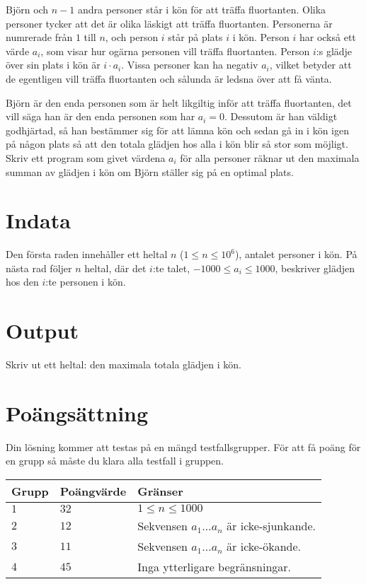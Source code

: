 Björn och $n-1$ andra personer står i kön för att träffa fluortanten. Olika personer tycker att det är olika läskigt att träffa fluortanten. Personerna är numrerade från $1$ till $n$, och person $i$ står på plats $i$ i kön. Person $i$ har också ett värde $a_i$, som visar hur ogärna personen vill träffa fluortanten. Person $i$:s glädje över sin plats i kön är $i \cdot a_i$. Vissa personer kan ha negativ $a_i$,
vilket betyder att de egentligen vill träffa fluortanten och sålunda är ledsna över att få vänta.

Björn är den enda personen som är helt likgiltig inför att träffa fluortanten, det vill säga han är den enda personen som har $a_i = 0$. Dessutom är han väldigt godhjärtad, så han bestämmer sig för att lämna kön och sedan gå in i kön igen på någon plats så att den totala glädjen hos alla i kön blir så stor som möjligt. Skriv ett program som givet värdena $a_i$ för alla personer räknar ut den maximala summan av glädjen i kön om Björn ställer sig på en optimal plats.

\section*{Indata}
Den första raden innehåller ett heltal $n$ ($1 \le n \le 10^6$), antalet personer i kön. På nästa rad följer $n$ heltal, där det $i$:te talet, $-1000 \le a_i \le 1000$, beskriver glädjen hos den $i$:te personen i kön.

\section*{Output}
Skriv ut ett heltal: den maximala totala glädjen i kön.

\section*{Poängsättning}
Din lösning kommer att testas på en mängd testfallsgrupper.
För att få poäng för en grupp så måste du klara alla testfall i gruppen.

\noindent
\begin{tabular}{| l | l | p{12cm} |}
  \hline
  Grupp & Poängvärde & Gränser \\ \hline
    $1$   & $32$     & $1 \leq n \leq 1000$ \\ \hline
    $2$   & $12$     & Sekvensen $a_1 \dots a_n$ är icke-sjunkande. \\ \hline
    $3$   & $11$     & Sekvensen $a_1 \dots a_n$ är icke-ökande. \\ \hline
    $4$   & $45$     & Inga ytterligare begränsningar. \\ \hline
\end{tabular}

